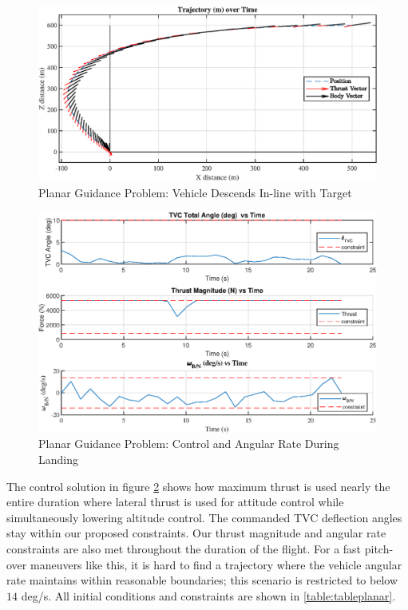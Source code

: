 \clearpage
\begin{figure}[!htbp] 
  \centering
  \includegraphics[width=\textwidth]{figs/planar_traj.eps}
  \caption{Planar Guidance Problem: Vehicle Descends In-line with Target}
  \label{fig:planar}
 \end{figure}
\begin{figure}[!htbp] 
\label{planar_controls}
  \centering
  \includegraphics[width=\textwidth]{figs/planar_controls.eps}
  \caption{Planar Guidance Problem: Control and Angular Rate During Landing}
  \label{fig:planarcontrols}
 \end{figure}
The control solution in figure \ref{fig:planarcontrols} shows how maximum thrust is used nearly the entire duration where lateral thrust is used for attitude control while simultaneously lowering altitude control. The commanded TVC deflection angles stay within our proposed constraints. Our thrust magnitude and angular rate constraints are also met throughout the duration of the flight. For a fast pitch-over maneuvers like this, it is hard to find a trajectory where the vehicle angular rate maintains within reasonable boundaries; this scenario is restricted to below $14$ deg/s. All initial conditions and constraints are shown in \ref{table:tableplanar}.

